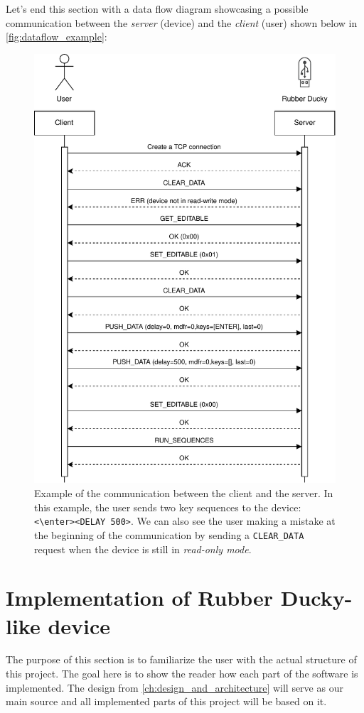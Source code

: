 Let's end this section with a data flow diagram showcasing a possible communication between the \emph{server} (device) and the \emph{client} (user) shown below in \autoref{fig:dataflow_example}:
\begin{figure}[ht]
    \centering
    \includegraphics[width=0.72\linewidth]{obrazky-figures/dataflow.pdf}
    \caption{Example of the communication between the client and the server. In this example, the user sends two key sequences to the device: \texttt{<\textbackslash{}enter><DELAY 500>}. We can also see the user making a mistake at the beginning of the communication by sending a \texttt{CLEAR\_DATA} request when the device is still in \emph{read-only mode}.}
    \label{fig:dataflow_example}
\end{figure}


\chapter{Implementation of Rubber Ducky-like device}
\label{ch:implementation}
The purpose of this section is to familiarize the user with the actual structure of this project. The goal here is to show the reader how each part of the software is implemented. The design from \autoref{ch:design_and_architecture} will serve as our main source and all implemented parts of this project will be based on it.


